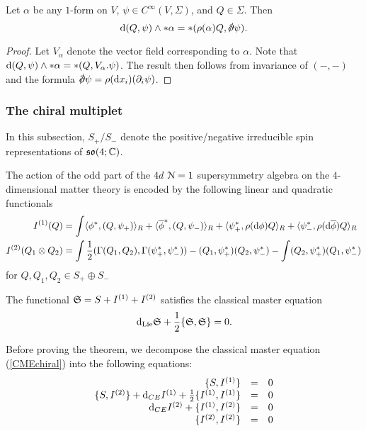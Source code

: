 \documentclass[10pt, oneside]{article}
\begin{document}
\begin{lem}
\label{lem: oneform}
Let $\alpha$ be any $1$-form on $V$, $\psi \in C^\infty(V, \Sigma)$,  and $Q \in \Sigma$. 
Then
\[
\d (Q, \psi) \wedge * \alpha = * (\rho(\alpha)Q, \sd \dd \psi) .
\]
\end{lem}
\begin{proof}
Let $V_\alpha$ denote the vector field corresponding to $\alpha$. 
Note that ${\rm d}(Q,\psi) \wedge * \alpha = * (Q, V_\alpha . \psi)$. 
The result then follows from invariance of $(-,-)$ and the formula $\sd \dd \psi = \rho(\d x_i) (\partial_i \psi)$. 
\end{proof}

\subsubsection{The chiral multiplet}

In this subsection, $S_+ / S_-$ denote the positive/negative irreducible spin representations of $\mathfrak{so}(4; \mathbb C)$. 

The action of the odd part of the $4d$ $\mathcal N=1$ supersymmetry algebra on the $4$-dimensional matter theory is encoded by the following linear and quadratic functionals 
\begin{align*}
I^{(1)}(Q) & = \int \langle\phi^*, (Q, \psi_+)\rangle_R + \langle\overline{\phi}^*, (Q, \psi_-)\rangle_R + \langle\psi_+^*, \rho({\rm d} \phi)Q \rangle_R +  \langle\psi_-^*, \rho({\rm d} \overline{\phi})Q \rangle_R \\
I^{(2)}  (Q_1 \otimes Q_2) & = \int \frac{1}{2}(\Gamma(Q_1, Q_2), \Gamma(\psi_+^*, \psi_-^*)) - (Q_1, \psi_+^*)(Q_2, \psi_-^*) - \int (Q_2, \psi_+^*)(Q_1, \psi_-^*) 
\end{align*}
for $Q, Q_1, Q_2 \in S_+ \oplus S_-$

\begin{thm}
The functional $\mathfrak S = S + I^{(1)} + I^{(2)}$ satisfies the classical master equation
\begin{equation}\label{CMEchiral}
{\rm d}_{\rm Lie} \mathfrak S + \frac{1}{2} \{\mathfrak S, \mathfrak S\} = 0 .
\end{equation}
\end{thm}

Before proving the theorem, we decompose the classical master equation (\ref{CMEchiral}) into the following equations:
\begin{equation}\label{CMEchiral2}
\begin{array}{rrrrrr}
\{S , I^{(1)}\} & = & 0 \\ 
\{S, I^{(2)}\} + {\rm d}_{CE} I^{(1)} + \frac{1}{2} \{I^{(1)}, I^{(1)}\} & = & 0 \\
{\rm d}_{CE} I^{(2)} + \{I^{(1)}, I^{(2)}\} & =& 0 \\
\{I^{(2)}, I^{(2)}\} & =& 0
\end{array}
\end{equation}
\end{document}
